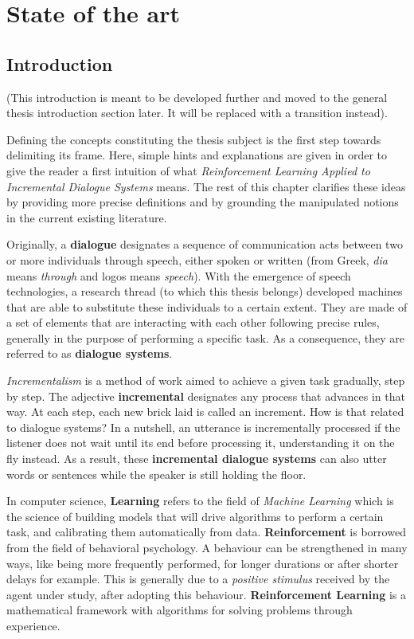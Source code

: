 \chapter{State of the art}

\label{ch:stateofart}

\section{Introduction}
				
				(This introduction is meant to be developed further and moved to the general thesis introduction section later. It will be replaced with a transition instead).

        Defining the concepts constituting the thesis subject is the first step towards delimiting its frame. Here, simple hints and explanations are given in order to give the reader a first intuition of what \textit{Reinforcement Learning Applied to Incremental Dialogue Systems} means. The rest of this chapter clarifies these ideas by providing more precise definitions and by grounding the manipulated notions in the current existing literature.

        Originally, a \textbf{dialogue} designates a sequence of communication acts between two or more individuals through speech, either spoken or written (from Greek, \textit{dia} means \textit{through} and logos means \textit{speech}). With the emergence of speech technologies, a research thread (to which this thesis belongs) developed machines that are able to substitute these individuals to a certain extent. They are made of a set of elements that are interacting with each other following precise rules, generally in the purpose of performing a specific task. As a consequence, they are referred to as \textbf{dialogue systems}.

        \textit{Incrementalism} is a method of work aimed to achieve a given task gradually, step by step. The adjective \textbf{incremental} designates any process that advances in that way. At each step, each new brick laid is called an increment. How is that related to dialogue systems? In a nutshell, an utterance is incrementally processed if the listener does not wait until its end before processing it, understanding it on the fly instead. As a result, these \textbf{incremental dialogue systems} can also utter words or sentences while the speaker is still holding the floor.

        In computer science, \textbf{Learning} refers to the field of \textit{Machine Learning} which is the science of building models that will drive algorithms to perform a certain task, and calibrating them automatically from data. \textbf{Reinforcement} is borrowed from the field of behavioral psychology. A behaviour can be strengthened in many ways, like being more frequently performed, for longer durations or after shorter delays for example. This is generally due to a \textit{positive stimulus} received by the agent under study, after adopting this behaviour. \textbf{Reinforcement Learning} is a mathematical framework with algorithms for solving problems through experience.

